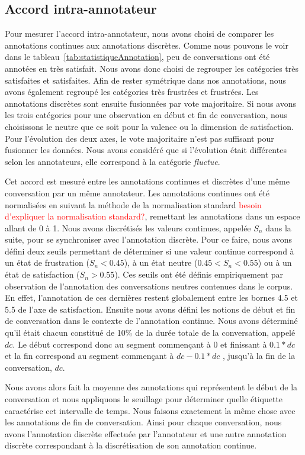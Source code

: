 \subsection{Accord intra-annotateur}
Pour mesurer l'accord intra-annotateur, nous avons choisi de comparer les annotations continues aux annotations discrètes. Comme nous pouvons le voir dans le tableau~\ref{tab:statistiqueAnnotation}, peu de conversations ont été annotées en très satisfait. Nous avons donc choisi de regrouper les catégories très satisfaites et satisfaites. Afin de rester symétrique dans nos annotations, nous avons également regroupé les catégories très frustrées et frustrées. Les annotations discrètes sont ensuite fusionnées par vote majoritaire. Si nous avons les trois catégories pour une observation en début et fin de conversation, nous choisissons le neutre que ce soit pour la valence ou la dimension de satisfaction. Pour l'évolution des deux axes, le vote majoritaire n'est pas suffisant pour fusionner les données. Nous avons considéré que si l'évolution était différentes selon les annotateurs, elle correspond à la catégorie \textit{fluctue}.

Cet accord est mesuré entre les annotations continues et discrètes d'une même conversation par un même annotateur. Les annotations continues ont été normalisées en suivant la méthode de la normalisation standard \textcolor{red}{besoin d'expliquer la normalisation standard?}, remettant les annotations dans un espace allant de 0 à 1.
Nous avons discrétisés les valeurs continues, appelée $S_n$ dans la suite, pour se synchroniser avec l'annotation discrète. Pour ce faire, nous avons défini deux seuils permettant de déterminer si une valeur continue correspond à un état de frustration ($S_n<0.45$), à un état neutre ($0.45 < S_n < 0.55$) ou à un état de satisfaction ($S_n > 0.55$). Ces seuils ont été définis empiriquement par observation de l'annotation des conversations neutres contenues dans le corpus. En effet, l'annotation de ces dernières restent globalement entre les bornes 4.5 et 5.5 de l'axe de satisfaction.
Ensuite nous avons défini les notions de début et fin de conversation dans le contexte de l'annotation continue. Nous avons déterminé qu'il était chacun constitué de 10\% de la durée totale de la conversation, appelé $dc$. Le début correspond donc au segment commençant à 0 et finissant à $0.1*dc$ et la fin correspond au segment commençant à $ dc - 0.1*dc$ , jusqu'à la fin de la conversation, $dc$.

Nous avons alors fait la moyenne des annotations qui représentent le début de la conversation et nous appliquons le seuillage pour déterminer quelle étiquette caractérise cet intervalle de temps. Nous faisons exactement la même chose avec les annotations de fin de conversation. Ainsi pour chaque conversation, nous avons l'annotation discrète effectuée par l'annotateur et une autre annotation discrète correspondant à la discrétisation de son annotation continue.

